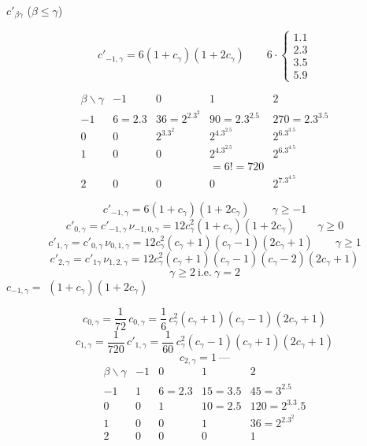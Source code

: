 \documentclass[11pt,a4paper]{article}
\begin{document}


$c'_{\beta\gamma}$ ($\beta\leqslant\gamma$)

\[
  c'_{-1,\gamma}=6(1+c_\gamma)(1+2c_\gamma)\qquad
  6\cdot\left\{\begin{array}{l}1.1\\2.3\\3.5\\5.9\end{array}\right.
\]

\[
  \begin{array}{c|c|c|c|c}
  \beta\backslash\gamma & -1 & 0 & 1 & 2\\\hline
  -1 & 6=2.3 & 36=2^2.3^2 & 90=2.3^2.5 & 270=2.3^3.5\\\hline
  0 & 0 & 2^3.3^2 & 2^4.3^2.5 & 2^6.3^3.5\\\hline
  1 & 0 & 0 & 2^4.3^2.5 & 2^6.3^4.5\\
    &   &   & =6!=720 & \\\hline
  2 & 0 & 0 & 0 & 2^7.3^4.5
  \end{array}
\]

\[
  c'_{-1,\gamma}=6(1+c_\gamma)(1+2c_\gamma)\qquad\gamma\geqslant-1
\]
\[
  c'_{0,\gamma}=c'_{-1,\gamma}\,\nu_{-1,0,\gamma}
  =12c_\gamma^2(1+c_\gamma)(1+2c_\gamma)\qquad\gamma\geqslant0
\]
\[
  c'_{1,\gamma}=c'_{0,\gamma}\,\nu_{0,1,\gamma}
  =12c_\gamma^2(c_\gamma+1)(c_\gamma-1)(2c_\gamma+1)\qquad\gamma\geqslant1
\]
\[
  c'_{2,\gamma}=c'_{1\gamma}\,\nu_{1,2,\gamma}
  =12c_\gamma^2(c_\gamma+1)(c_\gamma-1)(c_\gamma-2)(2c_\gamma+1)
\]
\[
  \gamma\geqslant2\ \text{i.e.}\ \gamma=2
\]
$c_{-1,\gamma}=$  \struck{\ill{}}
$(1+c_\gamma)(1+2c_\gamma)$

\[
  c_{0,\gamma}=\frac1{72}\,c_{0,\gamma}
  =\frac16\,c_\gamma^2(c_\gamma+1)(c_\gamma-1)(2c_\gamma+1)
\]
\[
  c_{1,\gamma}=\frac1{720}\,c'_{1,\gamma}
  =\frac1{60}\,c_\gamma^2(c_\gamma-1)(c_\gamma+1)(2c_\gamma+1)
\]
\[
  c_{2,\gamma}=1\ \text{—}
\]
\[
  \begin{array}{c|c|c|c|c}
  \beta\backslash\gamma & -1 & 0 & 1 & 2\\\hline
  -1 & 1 & 6=2.3 & 15=3.5 & 45=3^2.5\\\hline
  0 & 0 & 1 & 10=2.5 & 120=2^3.3.5\\\hline
  1 & 0 & 0 & 1 & 36=2^2.3^2\\\hline
  2 & 0 & 0 & 0 & 1
  \end{array}
\]
\end{document}
